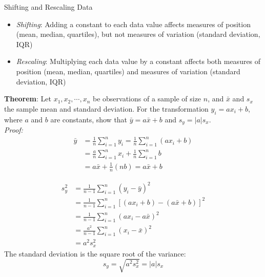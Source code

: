 \documentclass{beamer}
\begin{document}
\begin{frame}{Shifting and Rescaling Data}
\begin{itemize}
\item \emph{Shifting}: Adding a constant to each data value affects measures of position (mean, median, quartiles), but not measures of variation (standard deviation, IQR)
\vspace{10pt}
\item \emph{Rescaling}: Multiplying each data value by a constant affects both measures of position (mean, median, quartiles) and measures of variation (standard deviation, IQR)
\end{itemize}
\end{frame}

\begin{frame}
\textbf{Theorem}: Let $x_1, x_2, \cdots, x_n$ be observations of a sample of size $n$, and $\bar{x}$ and $s_x$ the sample mean and standard deviation.  For the transformation $y_i = a x_i + b$, where $a$ and $b$ are constants, show that $\bar{y} = a \bar{x} + b$ and $s_y = |a| s_x$.\\ 
\medskip
{\color{blue}
\emph{Proof:}
\begin{align*}
\bar{y} &= \frac{1}{n} \sum_{i=1}^n y_i
= \frac{1}{n} \sum_{i=1}^n (a x_i + b)\\
&= \frac{a}{n} \sum_{i=1}^n x_i + \frac{1}{n} \sum_{i=1}^n b\\
&= a \bar{x} + \frac{1}{n} (nb) = a \bar{x} + b
\end{align*}
}
\end{frame}

\begin{frame}
\normalsize
{\color{blue}
\begin{align*}
s_y^2 &= \frac{1}{n-1} \sum_{i=1}^n (y_i - \bar{y})^2\\
&= \frac{1}{n-1} \sum_{i=1}^n [(ax_i + b) - (a\bar{x} + b)]^2\\
&= \frac{1}{n-1} \sum_{i=1}^n (a x_i - a \bar{x})^2\\
&= \frac{a^2}{n-1} \sum_{i=1}^n (x_i - \bar{x})^2\\
&= a^2 s_x^2
\end{align*}
The standard deviation is the square root of the variance:
$$s_y = \sqrt{a^2 s_x^2} = |a|s_x$$
}

\end{frame}
\end{document}

